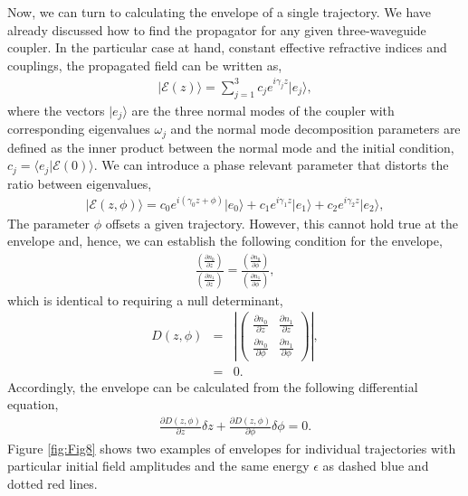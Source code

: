 \documentclass[9pt,twocolumn,twoside]{osajnl}
\begin{document}
Now, we can turn to calculating the envelope of a single trajectory. 
We have already discussed how to find the propagator for any given three-waveguide coupler. 
In the particular case at hand, constant effective refractive indices and couplings, the propagated field can be written as, 
\begin{eqnarray}
	\vert \mathcal{E}(z) \rangle =  \sum_{j=1}^{3} c_j e^{i \gamma_j z} \vert e_j \rangle,
\end{eqnarray}
where the vectors $\vert e_j \rangle$ are the three normal modes of the coupler with corresponding eigenvalues $\omega_j$ and the normal mode decomposition parameters are defined as the inner product between the normal mode and the initial condition,  $c_{j} = \langle e_{j} \vert \mathcal{E}(0) \rangle$. 
We can introduce a phase relevant parameter that distorts the ratio between eigenvalues, 
\begin{eqnarray}
\vert \mathcal{E}(z, \phi) \rangle = c_0 e^{i \left( \gamma_0 z + \phi \right) } \vert e_0 \rangle + c_1 e^{i \gamma_1 z} \vert e_1 \rangle + c_2 e^{i \gamma_2 z} \vert e_2 \rangle,
\end{eqnarray}
The parameter $\phi$ offsets a given trajectory. 
However, this cannot hold true at the envelope and, hence, we can establish the following condition for the envelope,
\begin{eqnarray}
	\frac{ (\frac{\partial n_0}{\partial z}) }{ (\frac{\partial n_1}{\partial z}) } = \frac{( \frac{\partial n_0}{\partial \phi})}{(\frac{\partial n_1}{\partial \phi}) } ,
\end{eqnarray}
which is identical to requiring a null determinant,
\begin{eqnarray}
	D(z, \phi) &=& \left\vert \left(  \begin{array}{cc} 
		\frac{\partial n_0}{\partial z} & \frac{\partial n_1}{\partial z} \\
		\frac{\partial n_0}{\partial \phi} & \frac{\partial n_1}{\partial \phi} 
	\end{array} \right) \right\vert, \\
	&=& 0.
\end{eqnarray}
Accordingly, the envelope can be calculated from the following differential equation,
\begin{eqnarray}
	\frac{\partial D(z,\phi)}{\partial z} \delta z +
	\frac{\partial D(z,\phi)}{\partial \phi} \delta \phi = 0. \label{eq:EnvInd}
\end{eqnarray}
Figure \ref{fig:Fig8} shows two examples of envelopes for individual trajectories with particular initial field amplitudes and the same energy $\epsilon$ as dashed blue and dotted red lines. 
\end{document}
